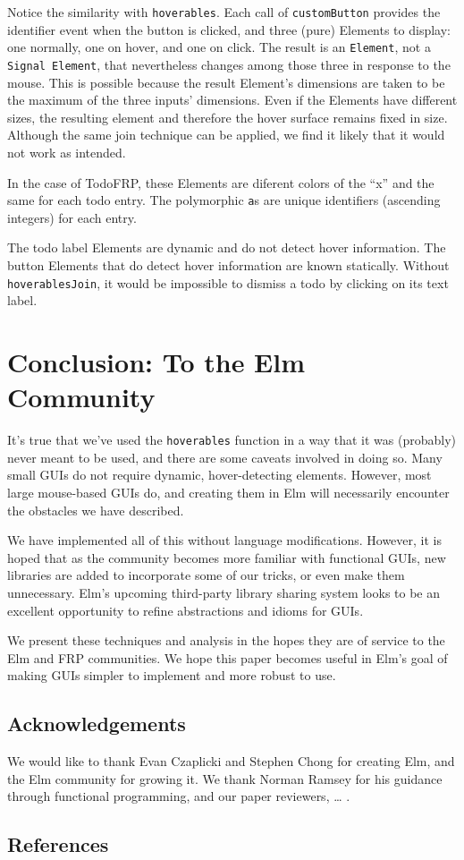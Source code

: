 \documentclass{article}
\begin{document}
Notice the similarity with \texttt{hoverables}. Each call of
\texttt{customButton} provides the identifier event when the button is
clicked, and three (pure) Elements to display: one normally, one on
hover, and one on click. The result is an \texttt{Element}, not a
\texttt{Signal Element}, that nevertheless changes among those three in
response to the mouse. This is possible because the result Element's
dimensions are taken to be the maximum of the three inputs' dimensions.
Even if the Elements have different sizes, the resulting element and
therefore the hover surface remains fixed in size. Although the same
join technique can be applied, we find it likely that it would not work
as intended.

In the case of TodoFRP, these Elements are diferent colors of the ``x''
and the same for each todo entry. The polymorphic \texttt{a}s are unique
identifiers (ascending integers) for each entry.

The todo label Elements are dynamic and do not detect hover information.
The button Elements that do detect hover information are known
statically. Without \texttt{hoverablesJoin}, it would be impossible to
dismiss a todo by clicking on its text label.

\section{Conclusion: To the Elm
Community}\label{conclusion-to-the-elm-community}

It's true that we've used the \texttt{hoverables} function in a way that
it was (probably) never meant to be used, and there are some caveats
involved in doing so. Many small GUIs do not require dynamic,
hover-detecting elements. However, most large mouse-based GUIs do, and
creating them in Elm will necessarily encounter the obstacles we have
described.

We have implemented all of this without language modifications. However,
it is hoped that as the community becomes more familiar with functional
GUIs, new libraries are added to incorporate some of our tricks, or even
make them unnecessary. Elm's upcoming third-party library sharing system
looks to be an excellent opportunity to refine abstractions and idioms
for GUIs.

We present these techniques and analysis in the hopes they are of
service to the Elm and FRP communities. We hope this paper becomes
useful in Elm's goal of making GUIs simpler to implement and more robust
to use.

\subsection{Acknowledgements}\label{acknowledgements}

We would like to thank Evan Czaplicki and Stephen Chong for creating
Elm, and the Elm community for growing it. We thank Norman Ramsey for
his guidance through functional programming, and our paper reviewers,
\ldots{} .

\subsection{References}\label{references}
\end{document}

